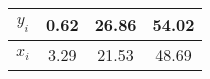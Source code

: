 \begin{table}[h!]
\centering
\begin{tabular}{|c|c|c|c|}
    \hline
    $y_i$ & 0.62 & 26.86 & 54.02 \\
    \hline
    $x_i$ & 3.29 & 21.53 & 48.69 \\
    \hline
\end{tabular}    
\end{table}
